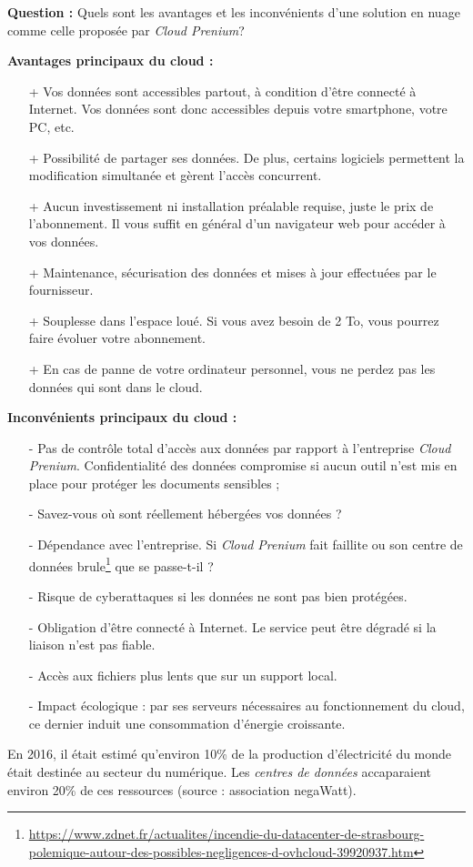\textbf{Question : }Quels sont les avantages et les inconvénients d'une solution en nuage comme celle proposée par \textit{Cloud Prenium}?

\textbf{Avantages principaux du cloud :}
\begin{enumerate}
	\item[+] Vos données sont accessibles partout, à condition d’être connecté à Internet. Vos données sont donc accessibles depuis votre smartphone, votre PC, etc.
	\item[+] Possibilité de partager ses données. De plus, certains logiciels permettent la modification simultanée et gèrent l’accès concurrent.
	\item[+] Aucun investissement ni installation préalable requise, juste le prix de l’abonnement. Il vous suffit en général d’un navigateur web pour accéder à vos données.
	\item[+] Maintenance, sécurisation des données et mises à jour effectuées par le fournisseur.
	\item[+] Souplesse dans l’espace loué. Si vous avez besoin de 2 To, vous pourrez faire évoluer votre abonnement.
	\item[+] En cas de panne de votre ordinateur personnel, vous ne perdez pas les données qui sont dans le cloud.
\end{enumerate}
\textbf{Inconvénients principaux du cloud :}
\begin{enumerate}
	\item[-] Pas de contrôle total d’accès aux données par rapport à l’entreprise \textit{Cloud Prenium}. Confidentialité des données compromise si aucun outil n’est mis en place pour protéger les documents sensibles ;
	\item[-] Savez-vous où sont réellement hébergées vos données ?
	\item[-] Dépendance avec l’entreprise. Si \textit{Cloud Prenium} fait faillite ou son centre de données brule\footnote{\url{https://www.zdnet.fr/actualites/incendie-du-datacenter-de-strasbourg-polemique-autour-des-possibles-negligences-d-ovhcloud-39920937.htm}} que se passe-t-il ? 
	\item[-] Risque de cyberattaques si les données ne sont pas bien protégées.
	\item[-] Obligation d’être connecté à Internet. Le service peut être dégradé si la liaison n’est pas fiable.
	\item[-] Accès aux fichiers plus lents que sur un support local.
	\item[-] Impact écologique : par ses serveurs nécessaires au fonctionnement du cloud, ce dernier induit une consommation d’énergie croissante.
\end{enumerate}
\begin{eclairage}
	En 2016, il était estimé qu'environ 10\% de la production d'électricité du monde était destinée au secteur du numérique. Les \textit{centres de données} accaparaient environ 20\% de ces ressources (source : association negaWatt). 
\end{eclairage}

